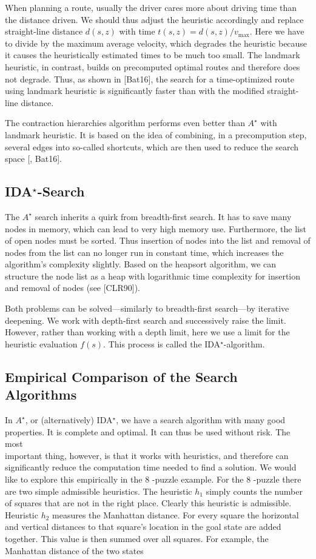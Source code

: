 \documentclass[10pt]{book}
\begin{document}
When planning a route, usually the driver cares more about driving time than the distance driven. We should thus adjust the heuristic accordingly and replace straight-line distance $d(s, z)$ with time $t(s, z)=d(s, z) / v_{\text{max}}$. Here we have to divide by the maximum average velocity, which degrades the heuristic because it causes the heuristically estimated times to be much too small. The landmark heuristic, in contrast, builds on precomputed optimal routes and therefore does not degrade. Thus, as shown in [Bat16], the search for a time-optimized route using landmark heuristic is significantly faster than with the modified straight-line distance.

The contraction hierarchies algorithm performs even better than $A^{\star}$ with landmark heuristic. It is based on the idea of combining, in a precompution step, several edges into so-called shortcuts, which are then used to reduce the search space [\cite{geisberger2008contraction}, Bat16].

\subsection{IDA$^{\star}$-Search}
The $A^{\star}$ search inherits a quirk from breadth-first search. It has to save many nodes in memory, which can lead to very high memory use. Furthermore, the list of open nodes must be sorted. Thus insertion of nodes into the list and removal of nodes from the list can no longer run in constant time, which increases the algorithm's complexity slightly. Based on the heapsort algorithm, we can structure the node list as a heap with logarithmic time complexity for insertion and removal of nodes (see [CLR90]).

Both problems can be solved—similarly to breadth-first search—by iterative deepening. We work with depth-first search and successively raise the limit. However, rather than working with a depth limit, here we use a limit for the heuristic evaluation $f(s)$. This process is called the IDA$^{\star}$-algorithm.

\subsection{Empirical Comparison of the Search Algorithms}
In $A^{\star}$, or (alternatively) IDA$^{\star}$, we have a search algorithm with many good properties. It is complete and optimal. It can thus be used without risk. The most\\
important thing, however, is that it works with heuristics, and therefore can significantly reduce the computation time needed to find a solution. We would like to explore this empirically in the 8 -puzzle example.
For the 8 -puzzle there are two simple admissible heuristics. The heuristic $h_{1}$ simply counts the number of squares that are not in the right place. Clearly this heuristic is admissible. Heuristic $h_{2}$ measures the Manhattan distance. For every square the horizontal and vertical distances to that square's location in the goal state are added together. This value is then summed over all squares. For example, the Manhattan distance of the two states
\end{document}
